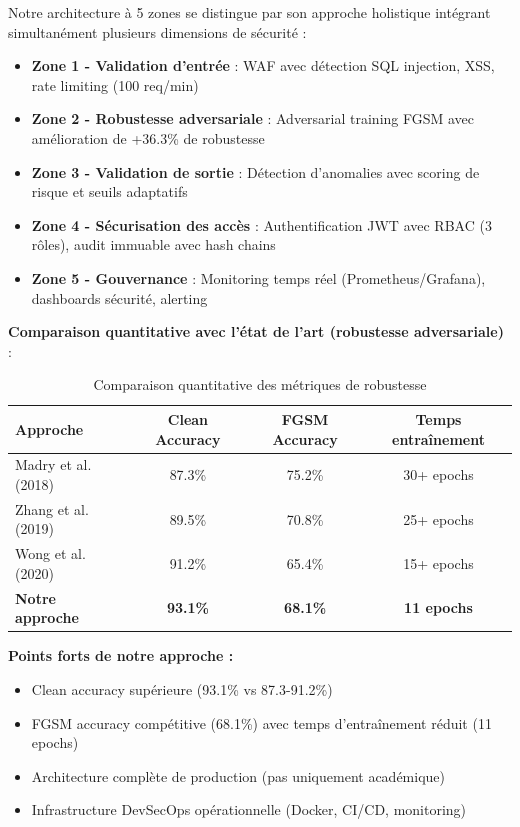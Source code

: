 Notre architecture à 5 zones se distingue par son approche holistique intégrant simultanément plusieurs dimensions de sécurité :

\begin{itemize}
    \item \textbf{Zone 1 - Validation d'entrée} : WAF avec détection SQL injection, XSS, rate limiting (100 req/min)
    \item \textbf{Zone 2 - Robustesse adversariale} : Adversarial training FGSM avec amélioration de +36.3\% de robustesse
    \item \textbf{Zone 3 - Validation de sortie} : Détection d'anomalies avec scoring de risque et seuils adaptatifs
    \item \textbf{Zone 4 - Sécurisation des accès} : Authentification JWT avec RBAC (3 rôles), audit immuable avec hash chains
    \item \textbf{Zone 5 - Gouvernance} : Monitoring temps réel (Prometheus/Grafana), dashboards sécurité, alerting
\end{itemize}

\textbf{Comparaison quantitative avec l'état de l'art (robustesse adversariale)} :

\begin{table}[H]
    \centering
    \caption{Comparaison quantitative des métriques de robustesse}
    \label{tab:quantitative_comparison}
    \small
    \begin{tabular}{lccc}
        \toprule
        \textbf{Approche} & \textbf{Clean Accuracy} & \textbf{FGSM Accuracy} & \textbf{Temps entraînement} \\
        \midrule
        Madry et al. (2018) & 87.3\% & 75.2\% & 30+ epochs \\
        Zhang et al. (2019) & 89.5\% & 70.8\% & 25+ epochs \\
        Wong et al. (2020) & 91.2\% & 65.4\% & 15+ epochs \\
        \midrule
        \textbf{Notre approche} & \textbf{93.1\%} & \textbf{68.1\%} & \textbf{11 epochs} \\
        \bottomrule
    \end{tabular}
\end{table}

\textbf{Points forts de notre approche :}
\begin{itemize}
    \item Clean accuracy supérieure (93.1\% vs 87.3-91.2\%)
    \item FGSM accuracy compétitive (68.1\%) avec temps d'entraînement réduit (11 epochs)
    \item Architecture complète de production (pas uniquement académique)
    \item Infrastructure DevSecOps opérationnelle (Docker, CI/CD, monitoring)
\end{itemize}

